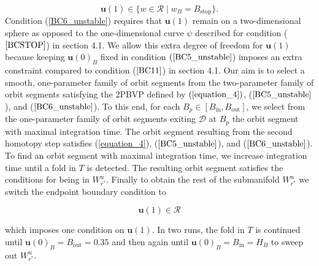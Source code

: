 \documentclass{ws-ijbc}
\begin{document}
\begin{equation}
\mathbf{u}(1) \in \{ w \in \mathscr{R} \; | \; w_B=B_{\mathrm{stop}}\}.
\label{BC6_unstable}
\end{equation}
\noindent
Condition (\ref{BC6_unstable}) requires that $\mathbf{u}(1)$ remain on a two-dimensional sphere as opposed to the one-dimensional curve $\psi$ described for condition ($\ref{BCSTOP}$) in section 4.1.  We allow this extra degree of freedom for $\mathbf{u}(1)$ because keeping $\mathbf{u}(0)_B$ fixed in condition $(\ref{BC5_unstable}$) imposes an extra constraint compared to condition ($\ref{BC11}$) in section 4.1.  Our aim is to select a smooth, one-parameter family of orbit segments from the two-parameter family of orbit segments satisfying the 2PBVP defined by $(\ref{equation_4})$, ($\ref{BC5_unstable}$), and ($\ref{BC6_unstable}$).  To this end, for each $B_p \in [B_{\mathrm{in}},B_{\mathrm{out}}]$, we select from the one-parameter family of orbit segments exiting $\mathscr{D}$ at $B_p$ the orbit segment with maximal integration time.  The orbit segment resulting from the second homotopy step satisfies (\ref{equation_4}), ($\ref{BC5_unstable}$), and ($\ref{BC6_unstable}$).  To find an orbit segment with maximal integration time, we increase integration time until a fold in $T$ is detected.  The resulting orbit segment satisfies the conditions for being in $W^u_{r^*}$.  Finally to obtain the rest of the submanifold $W^u_{r^*}$ we switch the endpoint boundary condition to

\begin{equation}
\mathbf{u}(1) \in \mathscr{R}
\label{BC7_unstable}
\end{equation}

\noindent
which imposes one condition on $\mathbf{u}(1)$.  In two runs, the fold in $T$ is continued until $\mathbf{u}(0)_B=B_{\mathrm{out}}=0.35$ and then again until $\mathbf{u}(0)_B=B_{\mathrm{in}}=H_B$ to sweep out $W^u_{r^*}$.
\end{document}
